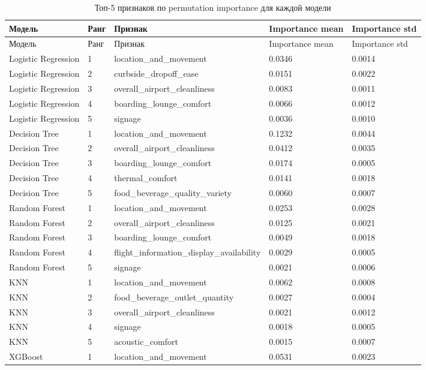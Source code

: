 \documentclass[14pt,a4paper]{extreport}
\begin{document}
\scriptsize
\begin{longtable}{lllll}
\caption{Топ-5 признаков по permutation importance для каждой модели}\label{tab:permutation_importance}\\
\toprule
Модель & Ранг & Признак & Importance mean & Importance std \\
\midrule
\endfirsthead
\toprule
Модель & Ранг & Признак & Importance mean & Importance std \\
\midrule
\endhead
Logistic Regression & 1 & location\_and\_movement & 0.0346 & 0.0014 \\
Logistic Regression & 2 & curbside\_dropoff\_ease & 0.0151 & 0.0022 \\
Logistic Regression & 3 & overall\_airport\_cleanliness & 0.0083 & 0.0011 \\
Logistic Regression & 4 & boarding\_lounge\_comfort & 0.0066 & 0.0012 \\
Logistic Regression & 5 & signage & 0.0036 & 0.0010 \\
Decision Tree & 1 & location\_and\_movement & 0.1232 & 0.0044 \\
Decision Tree & 2 & overall\_airport\_cleanliness & 0.0412 & 0.0035 \\
Decision Tree & 3 & boarding\_lounge\_comfort & 0.0174 & 0.0005 \\
Decision Tree & 4 & thermal\_comfort & 0.0141 & 0.0018 \\
Decision Tree & 5 & food\_beverage\_quality\_variety & 0.0060 & 0.0007 \\
Random Forest & 1 & location\_and\_movement & 0.0253 & 0.0028 \\
Random Forest & 2 & overall\_airport\_cleanliness & 0.0125 & 0.0021 \\
Random Forest & 3 & boarding\_lounge\_comfort & 0.0049 & 0.0018 \\
Random Forest & 4 & flight\_information\_display\_availability & 0.0029 & 0.0005 \\
Random Forest & 5 & signage & 0.0021 & 0.0006 \\
KNN & 1 & location\_and\_movement & 0.0062 & 0.0008 \\
KNN & 2 & food\_beverage\_outlet\_quantity & 0.0027 & 0.0004 \\
KNN & 3 & overall\_airport\_cleanliness & 0.0021 & 0.0012 \\
KNN & 4 & signage & 0.0018 & 0.0005 \\
KNN & 5 & acoustic\_comfort & 0.0015 & 0.0007 \\
XGBoost & 1 & location\_and\_movement & 0.0531 & 0.0023 \\

\end{longtable}
\end{document}
